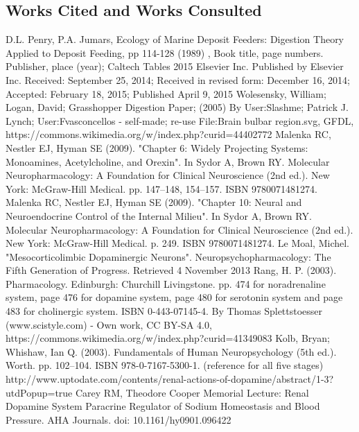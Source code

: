 \documentclass[smallextended]{svjour3}
\begin{document}
\subsection{Works Cited and Works Consulted}
                      
\begin{thebibliography}{}
D.L. Penry, P.A. Jumars, Ecology of Marine Deposit Feeders: Digestion Theory Applied to Deposit Feeding, pp 114-128 (1989)
, Book title, page numbers. Publisher, place (year); 
Caltech Tables
    2015 Elsevier Inc. Published by Elsevier Inc. 
Received: September 25, 2014; Received in revised form: December 16, 2014; Accepted: February 18, 2015; Published April 9, 2015
Wolesensky, William; Logan, David; Grasshopper Digestion Paper; (2005) 
By User:Slashme; Patrick J. Lynch; User:Fvasconcellos - self-made; re-use File:Brain bulbar region.svg, GFDL, https://commons.wikimedia.org/w/index.php?curid=44402772
    Malenka RC, Nestler EJ, Hyman SE (2009). "Chapter 6: Widely Projecting Systems: Monoamines, Acetylcholine, and Orexin". In Sydor A, Brown RY. Molecular Neuropharmacology: A Foundation for Clinical Neuroscience (2nd ed.). New York: McGraw-Hill Medical. pp. 147–148, 154–157. ISBN 9780071481274.
   Malenka RC, Nestler EJ, Hyman SE (2009). "Chapter 10: Neural and Neuroendocrine Control of the Internal Milieu". In Sydor A, Brown RY. Molecular Neuropharmacology: A Foundation for Clinical Neuroscience (2nd ed.). New York: McGraw-Hill Medical. p. 249. ISBN 9780071481274.
Le Moal, Michel. "Mesocorticolimbic Dopaminergic Neurons". Neuropsychopharmacology: The Fifth Generation of Progress. Retrieved 4 November 2013
Rang, H. P. (2003). Pharmacology. Edinburgh: Churchill Livingstone. pp. 474 for noradrenaline system, page 476 for dopamine system, page 480 for serotonin system and page 483 for cholinergic system. ISBN 0-443-07145-4.
By Thomas Splettstoesser (www.scistyle.com) - Own work, CC BY-SA 4.0, https://commons.wikimedia.org/w/index.php?curid=41349083
Kolb, Bryan; Whishaw, Ian Q. (2003). Fundamentals of Human Neuropsychology (5th ed.). Worth. pp. 102–104. ISBN 978-0-7167-5300-1. (reference for all five stages)
http://www.uptodate.com/contents/renal-actions-of-dopamine/abstract/1-3?utdPopup=true
Carey RM, Theodore Cooper Memorial Lecture: Renal Dopamine System Paracrine Regulator of Sodium Homeostasis and Blood Pressure. AHA Journals. doi: 10.1161/hy0901.096422

\end{thebibliography}
\end{document}
